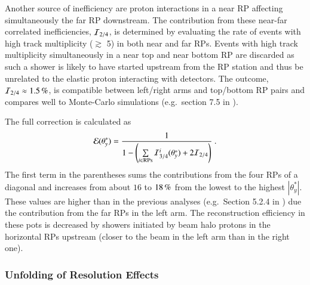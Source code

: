 Another source of inefficiency are proton interactions in a near RP affecting simultaneously the far RP downstream. The contribution from these near-far correlated inefficiencies, ${\cal I}_{2/4}$, is determined by evaluating the rate of events with high track multiplicity ($\gtrsim$ 5) in both near and far RPs. Events with high track multiplicity simultaneously in a near top and near bottom RP are discarded as such a shower is likely to have started upstream from the RP station and thus be unrelated to the elastic proton interacting with detectors. The outcome, ${\cal I}_{2/4} \approx 1.5\un{\%}$, is compatible between left/right arms and top/bottom RP pairs and compares well to Monte-Carlo simulations (e.g.~section 7.5 in \cite{hubert-thesis}).

The full correction is calculated as
\begin{equation}
\label{efficiency}
	{\cal E}(\theta_y^*) = {1\over 1 - \left( \sum\limits_{i\in \rm RPs} {\cal I}^i_{3/4}(\theta_y^*) + 2 {\cal I}_{2/4} \right) } \ .
\end{equation}
The first term in the parentheses sums the contributions from the four RPs of a diagonal and increases from about $16$ to $18\,{\rm \%}$ from the lowest to the highest $|\theta_y^*|$. These values are higher than in the previous analyses (e.g.~Section 5.2.4 in \cite{8tev-90m}) due the contribution from the far RPs in the left arm. The reconstruction efficiency in these pots is decreased by showers initiated by beam halo protons in the horizontal RPs upstream (closer to the beam in the left arm than in the right one).

\subsubsection{Unfolding of Resolution Effects}
\label{sec:unfolding}

